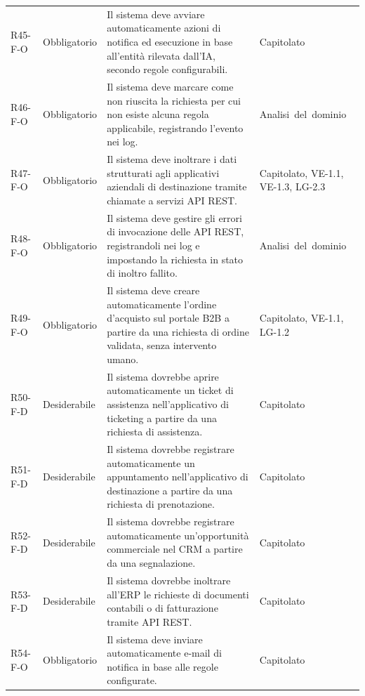 {\begin{longtable}{|>{\raggedright\arraybackslash}p{1.8cm}|>{\raggedright\arraybackslash}p{2.3cm}|>{\raggedright\arraybackslash}p{6.6cm}|>{\raggedright\arraybackslash}p{3.1cm}|}
    \multicolumn{4}{|l|}{\cellcolor[gray]{0.94}\textbf{Macroarea 5 --- Azioni, integrazione e gestione delle anomalie}} \\ \hline
    \mbox{R45-F-O} & Obbligatorio & Il sistema deve avviare automaticamente azioni di notifica ed esecuzione in base all'entità rilevata dall'IA, secondo regole configurabili. & \mbox{Capitolato} \\ \hline
    \mbox{R46-F-O} & Obbligatorio & Il sistema deve marcare come non riuscita la richiesta per cui non esiste alcuna regola applicabile, registrando l'evento nei log. & \mbox{Analisi del dominio} \\ \hline
    \mbox{R47-F-O} & Obbligatorio & Il sistema deve inoltrare i dati strutturati agli applicativi aziendali di destinazione tramite chiamate a servizi API REST. & \mbox{Capitolato}, \mbox{VE-1.1}, \mbox{VE-1.3}, \mbox{LG-2.3} \\ \hline
    \mbox{R48-F-O} & Obbligatorio & Il sistema deve gestire gli errori di invocazione delle API REST, registrandoli nei log e impostando la richiesta in stato di inoltro fallito. & \mbox{Analisi del dominio} \\ \hline
    \mbox{R49-F-O} & Obbligatorio & Il sistema deve creare automaticamente l'ordine d'acquisto sul portale B2B a partire da una richiesta di ordine validata, senza intervento umano. & \mbox{Capitolato}, \mbox{VE-1.1}, \mbox{LG-1.2} \\ \hline
    \mbox{R50-F-D} & Desiderabile & Il sistema dovrebbe aprire automaticamente un ticket di assistenza nell'applicativo di ticketing a partire da una richiesta di assistenza. & \mbox{Capitolato} \\ \hline
    \mbox{R51-F-D} & Desiderabile & Il sistema dovrebbe registrare automaticamente un appuntamento nell'applicativo di destinazione a partire da una richiesta di prenotazione. & \mbox{Capitolato} \\ \hline
    \mbox{R52-F-D} & Desiderabile & Il sistema dovrebbe registrare automaticamente un'opportunità commerciale nel CRM a partire da una segnalazione. & \mbox{Capitolato} \\ \hline
    \mbox{R53-F-D} & Desiderabile & Il sistema dovrebbe inoltrare all'ERP le richieste di documenti contabili o di fatturazione tramite API REST. & \mbox{Capitolato} \\ \hline
    \mbox{R54-F-O} & Obbligatorio & Il sistema deve inviare automaticamente e-mail di notifica in base alle regole configurate. & \mbox{Capitolato} \\ \hline

\end{longtable}}
